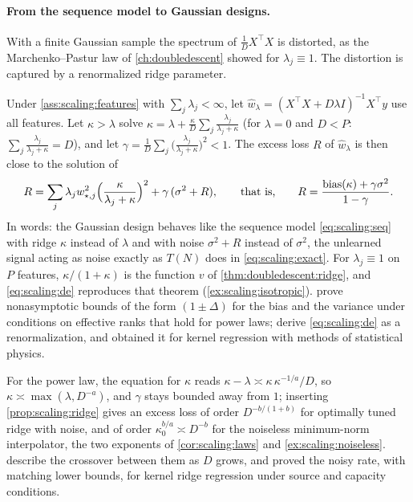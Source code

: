 \begin{refsection}
\paragraph{From the sequence model to Gaussian designs.} With a finite Gaussian sample the spectrum of $\frac1DX^\top X$ is distorted, as the Marchenko--Pastur law of \cref{ch:doubledescent} showed for $\lambda_j\equiv1$. The distortion is captured by a renormalized ridge parameter.

\begin{heuristic}
Under \cref{ass:scaling:features} with $\sum_j\lambda_j<\infty$, let $\hat w_\lambda=(X^\top X+D\lambda I)^{-1}X^\top y$ use all features. Let $\kappa>\lambda$ solve $\kappa=\lambda+\frac\kappa D\sum_j\frac{\lambda_j}{\lambda_j+\kappa}$ (for $\lambda=0$ and $D<P$: $\sum_j\frac{\lambda_j}{\lambda_j+\kappa}=D$), and let $\gamma=\frac1D\sum_j\bigl(\frac{\lambda_j}{\lambda_j+\kappa}\bigr)^2<1$. The excess loss $R$ of $\hat w_\lambda$ is then close to the solution of
\begin{equation}\label{eq:scaling:de}
  R=\sum_j\lambda_jw_{\star,j}^2\Bigl(\frac\kappa{\lambda_j+\kappa}\Bigr)^2+\gamma\,(\sigma^2+R),\qquad\text{that is,}\qquad R=\frac{\text{bias}(\kappa)+\gamma\sigma^2}{1-\gamma}.
\end{equation}
In words: the Gaussian design behaves like the sequence model \eqref{eq:scaling:seq} with ridge $\kappa$ instead of $\lambda$ and with noise $\sigma^2+R$ instead of $\sigma^2$, the unlearned signal acting as noise exactly as $T(N)$ does in \eqref{eq:scaling:exact}. For $\lambda_j\equiv1$ on $P$ features, $\kappa/(1+\kappa)$ is the function $v$ of \cref{thm:doubledescent:ridge}, and \eqref{eq:scaling:de} reproduces that theorem (\cref{ex:scaling:isotropic}). \Textcite{ChengMontanari2024} prove nonasymptotic bounds of the form $(1\pm\Delta)$ for the bias and the variance under conditions on effective ranks that hold for power laws; \textcite{AtanasovEtAl2024} derive \eqref{eq:scaling:de} as a renormalization, and \textcite{BordelonEtAl2020} obtained it for kernel regression with methods of statistical physics.
\end{heuristic}

For the power law, the equation for $\kappa$ reads $\kappa-\lambda\asymp\kappa\,\kappa^{-1/a}/D$, so $\kappa\asymp\max(\lambda,D^{-a})$, and $\gamma$ stays bounded away from $1$; inserting \cref{prop:scaling:ridge} gives an excess loss of order $D^{-b/(1+b)}$ for optimally tuned ridge with noise, and of order $\kappa_0^{b/a}\asymp D^{-b}$ for the noiseless minimum-norm interpolator, the two exponents of \cref{cor:scaling:laws} and \cref{ex:scaling:noiseless}. \Textcite{CuiEtAl2021} describe the crossover between them as $D$ grows, and \textcite{CaponnettoDeVito2007} proved the noisy rate, with matching lower bounds, for kernel ridge regression under source and capacity conditions.


\end{refsection}
